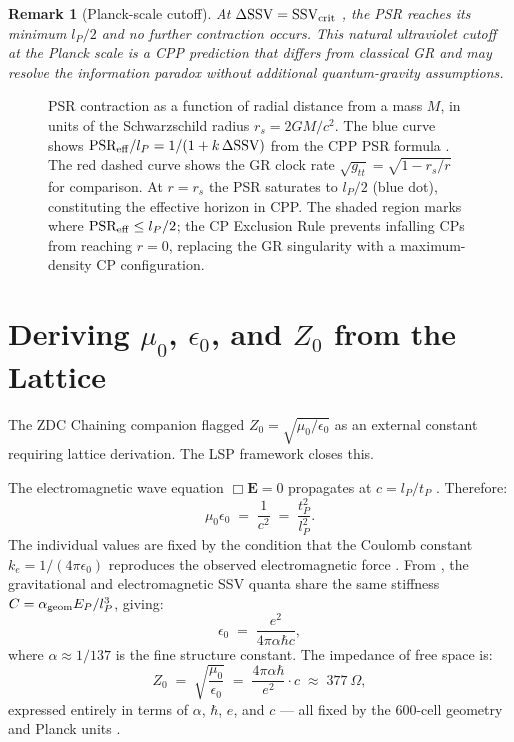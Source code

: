 \documentclass[12pt]{article}
\newtheorem{remark}[theorem]{Remark}
\newcommand{\lP}{l_P}
\newcommand{\tP}{t_P}
\newcommand{\EP}{E_P}
\newcommand{\SSV}{\text{SSV}}
\newcommand{\PSR}{\text{PSR}}
\newcommand{\alphageom}{\alpha_{\rm geom}}
\begin{document}
\begin{remark}[Planck-scale cutoff]
At $\Delta\SSV = \SSV_{\rm crit}$ \citep[Eq.~1]{abshier2026sr},
the PSR reaches its minimum $\lP/2$ and no further contraction occurs.
This natural ultraviolet cutoff at the Planck scale is a CPP prediction
that differs from classical GR \citep{einstein1915} and may resolve
the information paradox without additional quantum-gravity assumptions.
\end{remark}

\begin{figure}[H]
  \centering
  
  \caption{PSR contraction as a function of radial distance from a
  mass $M$, in units of the Schwarzschild radius $r_s = 2GM/c^2$.
  The blue curve shows
  $\PSR_{\rm eff}/\lP = 1/(1 + k\,\Delta\SSV)$ from the CPP PSR
  formula \citep{abshier2026sr}.
  The red dashed curve shows the GR clock rate
  $\sqrt{g_{tt}} = \sqrt{1 - r_s/r}$ for comparison.
  At $r = r_s$ the PSR saturates to $\lP/2$ (blue dot), constituting
  the effective horizon in CPP.
  The shaded region marks where $\PSR_{\rm eff} \leq \lP/2$; the CP
  Exclusion Rule \citep{abshier2026am} prevents infalling CPs from
  reaching $r = 0$, replacing the GR singularity with a
  maximum-density CP configuration.}
  \label{fig:psr_horizon}
\end{figure}
\section{Deriving $\mu_0$, $\epsilon_0$, and $Z_0$ from the Lattice}
\label{sec:mu0eps0}

The ZDC Chaining companion \citep{abshier2026zdc} flagged
$Z_0 = \sqrt{\mu_0/\epsilon_0}$ as an external constant requiring
lattice derivation.  The LSP framework closes this.

The electromagnetic wave equation $\Box\mathbf{E} = 0$ propagates at
$c = \lP/\tP$ \citep[{\S}5.1]{abshier2026am}.  Therefore:
\begin{equation}
  \mu_0\epsilon_0 \;=\; \frac{1}{c^2} \;=\; \frac{\tP^2}{\lP^2}.
  \label{eq:mu0eps0}
\end{equation}
The individual values are fixed by the condition that the Coulomb
constant $k_e = 1/(4\pi\epsilon_0)$ reproduces the observed
electromagnetic force \citep{codata2018}.  From \citet{abshier2026grav},
the gravitational and electromagnetic SSV quanta share the same
stiffness $C = \alphageom\EP/\lP^3$, giving:
\begin{equation}
  \epsilon_0 \;=\; \frac{e^2}{4\pi\alpha\hbar c},
  \label{eq:eps0}
\end{equation}
where $\alpha \approx 1/137$ is the fine structure constant.
The impedance of free space is:
\begin{equation}
  Z_0 \;=\; \sqrt{\frac{\mu_0}{\epsilon_0}}
  \;=\; \frac{4\pi\alpha\hbar}{e^2}\cdot c
  \;\approx\; 377\ \Omega,
  \label{eq:Z0}
\end{equation}
expressed entirely in terms of $\alpha$, $\hbar$, $e$, and $c$ ---
all fixed by the 600-cell geometry and Planck units \citep{codata2018}.
\end{document}
